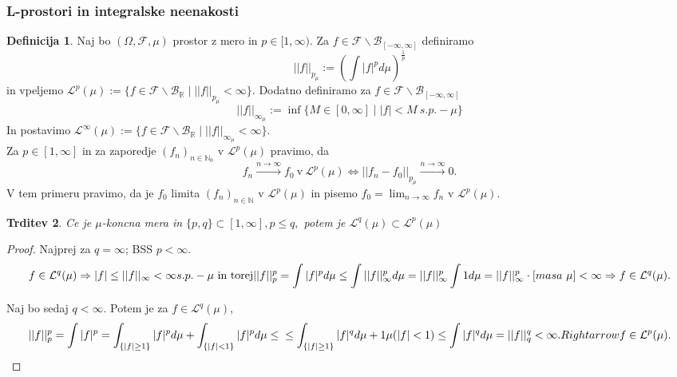 \documentclass[a4paper,12pt]{article}
\theoremstyle{definition} %
\newtheorem{definicija}{Definicija}[section]
\theoremstyle{plain} %
\newtheorem{trditev}[definicija]{Trditev}
\newcommand{\R}{\mathbb{R}}
\newcommand{\N}{\mathbb{N}}
\newcommand{\F}{\mathcal{F}}
\newcommand{\Le}{\mathcal{L}}
\begin{document}
        \subsubsection{L-prostori in integralske neenakosti}
            \begin{definicija}
                Naj bo $(\Omega, \F, \mu)$ prostor z mero in $p\in[1, \infty).$ Za $f \in \F\backslash\mathcal{B}_{[-\infty, \infty]}$ definiramo
                $$
                    ||f||_{p_\mu} := \left(\int |f|^pd\mu\right)^{\frac{1}{p}}
                $$
                in vpeljemo $ \mathcal{L}^p(\mu) := \{f \in \F\backslash\mathcal{B}_{\R} \mid ||f||_{p_\mu} < \infty\}.$
                Dodatno definiramo za $f \in \F\backslash\mathcal{B}_{[-\infty, \infty]}$
                $$
                    ||f||_{\infty_\mu} := \inf\{M \in [0, \infty] \mid |f| < M \ s.p.-\mu\}
                $$
                In postavimo $\mathcal{L}^\infty(\mu) := \{f \in \F\backslash\mathcal{B}_{\R} \mid ||f||_{\infty_\mu} < \infty\}.$ \\
                Za $p\in[1, \infty]$ in za zaporedje $(f_n)_{n\in\N_0}$ v $\mathcal{L}^p(\mu)$ pravimo, da 
                $$
                f_n \xrightarrow{n \rightarrow \infty}{} f_0 \ \text{v} \ \Le^p(\mu) \iff ||f_n - f_0||_{p_\mu} \xrightarrow{n \rightarrow \infty}{} 0.
                $$
                V tem primeru pravimo, da je $f_0$ limita $(f_n)_{n\in\N}$ v $\mathcal{L}^p(\mu)$ in pisemo $f_0 = \lim_{n\rightarrow\infty}f_n$ v $\mathcal{L}^p(\mu)$.
                

            \end{definicija}

            \begin{trditev}
                Ce je $\mu$-koncna mera in $\{p, q\}\subset[1, \infty], p \leq q,$ potem je $\mathcal{L}^q(\mu) \subset \mathcal{L}^p(\mu)$
            \end{trditev}

            \begin{proof}
                Najprej za $q = \infty$; BSS $p < \infty$.
                $$
                    f \in \Le^q(\mu) \Rightarrow |f| \leq ||f||_\infty < \infty s.p.-\mu \ \text{in torej} \\
                    ||f||_p^p = \int |f|^p d\mu \leq \int ||f||_\infty^p d\mu = ||f||_\infty^p \int 1 d\mu \\
                    = ||f||_\infty^p \cdot [masa \ \mu] < \infty \Rightarrow f \in \Le^q(\mu).
                $$

                Naj bo sedaj $q < \infty$. Potem je za $f \in \Le^q(\mu)$, 
                $$
                    ||f||_p^p = \int|f|^p = \int_{\{|f| \geq  1\}} |f|^p d\mu + \int_{\{|f| < 1\}} |f|^p d\mu \leq \\
                    \leq \int_{\{|f| \geq 1\}}|f|^q d\mu + 1\mu(|f|<1) \leq \int|f|^qd\mu = ||f||_q^q < \infty.\\
                    Rightarrow f \in \Le^p(\mu).
                $$
            \end{proof}
\end{document}
